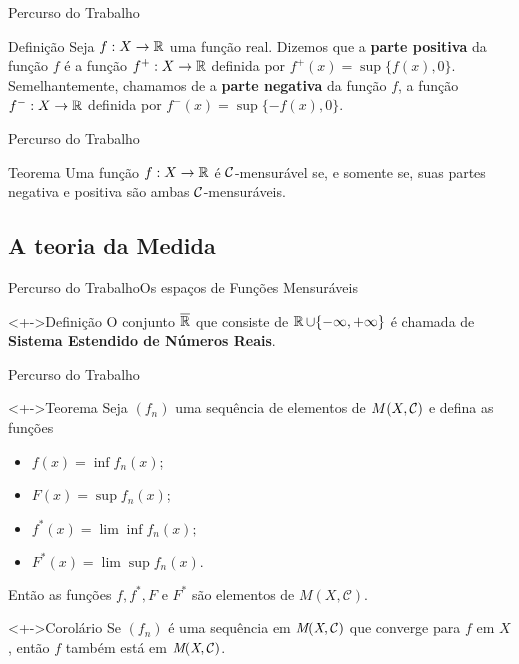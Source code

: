 	\begin{frame}{Percurso do Trabalho}
		\begin{block}{Definição}
			\justify Seja $f: X \to \operatorname{\mathbb{R}}$ uma função real. 
			Dizemos que a \textbf{parte positiva} da função $f$ é a função $f^+: X \to \operatorname{\mathbb{R}}$ definida por $f^+(x) = \sup\{f(x), 0\}$.
			Semelhantemente, chamamos de a \textbf{parte negativa} da função $f$, a função $f^-: X \to \operatorname{\mathbb{R}}$ definida por $f^-(x) = \sup\{-f(x), 0\}$.
		\end{block}
	\end{frame}

	\begin{frame}{Percurso do Trabalho}
		\begin{block}{Teorema}
			\justify Uma função $f: X \to \operatorname{\mathbb{R}}$ é $\operatorname{\mathcal{C}}$-mensurável se, e somente se, suas partes negativa e positiva são ambas $\operatorname{\mathcal{C}}$-mensuráveis.
		\end{block}
	\end{frame}

	
	\subsection{A teoria da Medida}
	\begin{frame}{Percurso do Trabalho}{Os espaços de Funções Mensuráveis}
		\begin{block}<+->{Definição}
      	 \justify O conjunto $\overline{\operatorname{\mathbb{R}}}$ que consiste de $\operatorname{\mathbb{R}} \cup \{-\infty, +\infty\}$ é chamada de \textbf{Sistema Estendido de Números Reais}.
		\end{block}
	\end{frame}
	
	\begin{frame}{Percurso do Trabalho}
		\begin{block}<+->{Teorema}
			\justify Seja $(f_n)$ uma sequência de elementos de $M(X,\operatorname{\mathcal{C}})$ e defina as funções
			\begin{itemize}
				\item $ f(x) = \inf f_n(x)$;  
				\item $F(x) = \sup f_n(x)$;  
				\item $f^*(x) = \lim\inf f_n(x);$   
				\item $F^*(x) = \lim\sup f_n(x).$	
			\end{itemize}
				Então as funções $f , f^* , F$ e $F^*$ são elementos de $M(X, \mathcal{C})$.
		\end{block}
		\begin{block}<+->{Corolário}
			\justify Se $(f_n)$ é uma sequência em $\operatorname{\textit{M}(\textit{X}, \mathcal{C} )}$ que converge para $f$ em $X$, então
			$f$ também está em $\operatorname{\textit{M}(\textit{X}, \mathcal{C} )}$.
		\end{block}
	\end{frame}	

